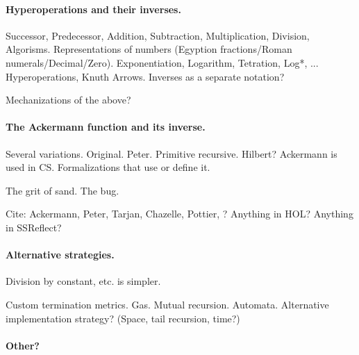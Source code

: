 \label{sec:related}

\paragraph*{Hyperoperations and their inverses.}
Successor, Predecessor, Addition, Subtraction, Multiplication, Division, Algorisms.  Representations of numbers (Egyption fractions/Roman numerals/Decimal/Zero).  Exponentiation, Logarithm, Tetration, Log*, ...   Hyperoperations, Knuth Arrows.  Inverses as a separate notation?

Mechanizations of the above?


\paragraph*{The Ackermann function and its inverse.}

Several variations.  Original.  Peter.  Primitive recursive.  Hilbert?  Ackermann is used in CS.  Formalizations that use or define it.

The grit of sand.  The bug.

Cite: Ackermann, Peter, Tarjan, Chazelle, Pottier, ?  Anything in HOL?  Anything in SSReflect?

\paragraph*{Alternative strategies.}

Division by constant, etc. is simpler.

Custom termination metrics.  Gas.  Mutual recursion.  Automata.  Alternative implementation strategy?  (Space, tail recursion, time?)

\paragraph*{Other?}